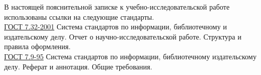 В настоящей пояснительной записке к учебно-исследовательской работе
использованы ссылки на следующие стандарты.\\

\href{http://nauka.kz/upload/files/17._GOST_7.32-2001.pdf}{ГОСТ 7.32-2001}
Система стандартов по информации, библиотечному и издательскому делу. Отчет о
научно-исследовательской работе. Структура и правила оформления.\\

\href{http://nauka.kz/upload/files/05._GOST_7.9-95.pdf}{ГОСТ 7.9-95}
Система стандартов по информации, библиотечному издательскому делу. Реферат
и аннотация. Общие требования.

